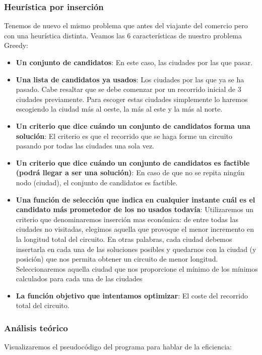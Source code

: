 \documentclass[10pt,a4paper]{article}
\begin{document}
\subsubsection{Heurística por inserción}
Tenemos de nuevo el mismo problema que antes del viajante del comercio pero con una heurística distinta. Veamos las 6 características de nuestro problema Greedy:
	\begin{itemize}
		\item \textbf{Un conjunto de candidatos}: En este caso, las ciudades por las que pasar.
		\item \textbf{Una lista de candidatos ya usados}: Los ciudades por las que ya se ha pasado. Cabe resaltar que se debe comenzar por un recorrido inicial de 3 ciudades previamente. Para escoger estas ciudades simplemente lo haremos escogiendo la ciudad más al oeste, la más al este y la más al norte.
		\item \textbf{Un criterio que dice cuándo un conjunto de candidatos forma una solución}: El criterio es que el recorrido que se haga forme un circuito pasando por todas las ciudades una sola vez.
		\item \textbf{Un criterio que dice cuándo un conjunto de candidatos es factible (podrá llegar a ser una solución)}: En caso de que no se repita ningún nodo (ciudad), el conjunto de candidatos es factible.
		\item \textbf{Una función de selección que indica en cualquier instante cuál es el candidato más prometedor de los no usados todavía}: Utilizaremos un criterio que denominaremos inserción mas económica: de entre todas las ciudades no visitadas, elegimos aquella que provoque el menor incremento en la longitud total del circuito.
En otras palabras, cada ciudad debemos insertarla en cada una de las soluciones posibles y quedarnos con la ciudad (y posición) que nos permita obtener un circuito de menor longitud. Seleccionaremos aquella ciudad que nos proporcione el mínimo de los mínimos calculados para cada una de las ciudades
		\item \textbf{La función objetivo que intentamos optimizar}: El coste del recorrido total del circuito.
\end{itemize}
\subsubsection*{Análisis teórico}
Visualizaremos el pseudocódigo del programa para hablar de la eficiencia:
\\

\end{document}
